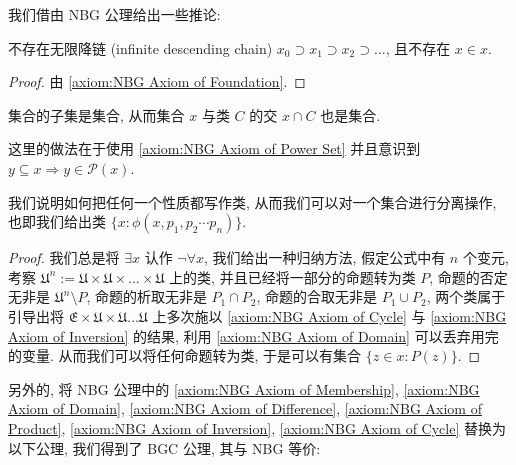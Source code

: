 我们借由 NBG 公理给出一些推论:

\begin{corollary}
    \label {corollary:no infinite descending chain}
    不存在无限降链 (infinite descending chain) \(x_0 \supset x_1 \supset x_2 \supset \dots\), 且不存在 \(x \in x\).

    \begin{proof}
        由 \ref{axiom:NBG Axiom of Foundation}.
    \end{proof}
\end{corollary}

\begin{corollary}
    \label {corollary:NBG every set can be separated by a class}
    集合的子集是集合, 从而集合 \(x\) 与类 \(C\) 的交 \(x \cap C\) 也是集合.

    这里的做法在于使用 \ref{axiom:NBG Axiom of Power Set} 并且意识到 \(y \subseteq x \Rightarrow y \in \mathcal{P} (x)\).
\end{corollary}

\begin{corollary}
    \label {corollary:NBG every property can be written as a class}
    我们说明如何把任何一个性质都写作类, 从而我们可以对一个集合进行分离操作, 也即我们给出类 \(\{x : \phi(x,p_1,p_2 \cdots p_n)\}\).

    \begin{proof}
        我们总是将 \(\exists x\) 认作 \(\neg \forall x\), 我们给出一种归纳方法,
        假定公式中有 \(n\) 个变元, 考察 \(\mathfrak{U}^n := \mathfrak{U} \times \mathfrak{U} \times \dots \times \mathfrak{U}\) 上的类,
        并且已经将一部分的命题转为类 \(P\), 命题的否定无非是 \(\mathfrak{U}^n \setminus P\), 命题的析取无非是 \(P_1 \cap P_2\),
        命题的合取无非是 \(P_1 \cup P_2\), 两个类属于引导出将 \(\mathfrak{E} \times \mathfrak{U} \times \mathfrak{U} \dots \mathfrak{U}\) 上多次施以
        \ref{axiom:NBG Axiom of Cycle} 与 \ref{axiom:NBG Axiom of Inversion} 的结果, 利用 \ref{axiom:NBG Axiom of Domain} 可以丢弃用完的变量.
        从而我们可以将任何命题转为类, 于是可以有集合 \(\{z \in x : P(z)\}\).
    \end{proof}
\end{corollary}

另外的, 将 NBG 公理中的 \ref{axiom:NBG Axiom of Membership}, \ref{axiom:NBG Axiom of Domain},
\ref{axiom:NBG Axiom of Difference}, \ref{axiom:NBG Axiom of Product}, \ref{axiom:NBG Axiom of Inversion},
\ref{axiom:NBG Axiom of Cycle} 替换为以下公理, 我们得到了 BGC 公理, 其与 NBG 等价:

